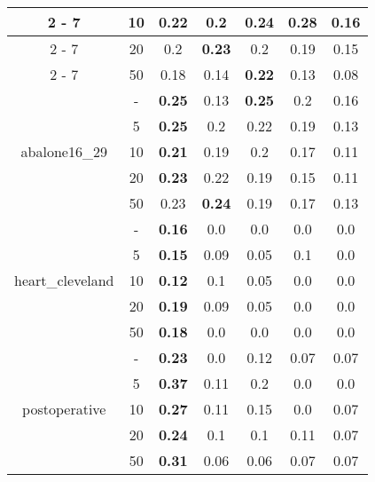 \documentclass{article}%
\begin{document}
\begin{longtable}{c|c|ccccc}
\cline{2%
-%
7}%
&10&0.22&0.2&0.24&\textbf{0.28}&0.16\\%
\cline{2%
-%
7}%
&20&0.2&\textbf{0.23}&0.2&0.19&0.15\\%
\cline{2%
-%
7}%
&50&0.18&0.14&\textbf{0.22}&0.13&0.08\\%
\hline%
\multirow{5}{*}{abalone16\_29}&{-}&\textbf{0.25}&0.13&\textbf{0.25}&0.2&0.16\\%
\cline{2%
-%
7}%
&5&\textbf{0.25}&0.2&0.22&0.19&0.13\\%
\cline{2%
-%
7}%
&10&\textbf{0.21}&0.19&0.2&0.17&0.11\\%
\cline{2%
-%
7}%
&20&\textbf{0.23}&0.22&0.19&0.15&0.11\\%
\cline{2%
-%
7}%
&50&0.23&\textbf{0.24}&0.19&0.17&0.13\\%
\hline%
\multirow{5}{*}{heart\_cleveland}&{-}&\textbf{0.16}&0.0&0.0&0.0&0.0\\%
\cline{2%
-%
7}%
&5&\textbf{0.15}&0.09&0.05&0.1&0.0\\%
\cline{2%
-%
7}%
&10&\textbf{0.12}&0.1&0.05&0.0&0.0\\%
\cline{2%
-%
7}%
&20&\textbf{0.19}&0.09&0.05&0.0&0.0\\%
\cline{2%
-%
7}%
&50&\textbf{0.18}&0.0&0.0&0.0&0.0\\%
\hline%
\multirow{5}{*}{postoperative}&{-}&\textbf{0.23}&0.0&0.12&0.07&0.07\\%
\cline{2%
-%
7}%
&5&\textbf{0.37}&0.11&0.2&0.0&0.0\\%
\cline{2%
-%
7}%
&10&\textbf{0.27}&0.11&0.15&0.0&0.07\\%
\cline{2%
-%
7}%
&20&\textbf{0.24}&0.1&0.1&0.11&0.07\\%
\cline{2%
-%
7}%
&50&\textbf{0.31}&0.06&0.06&0.07&0.07\\%
\hline%
\end{longtable}

%
\end{document}
